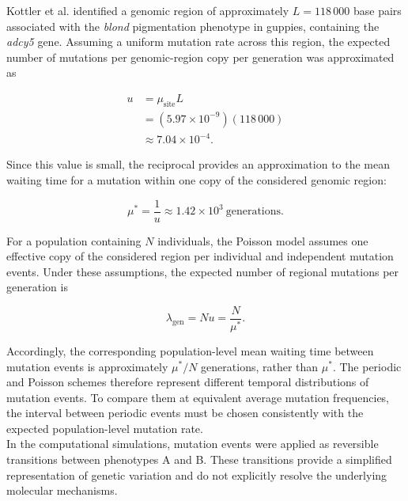 Kottler et al. \cite{kottlerAdenylateCyclase52015} identified a genomic region of approximately $L=118\,000$ base pairs associated with the \textit{blond} pigmentation phenotype in guppies, containing the \textit{adcy5} gene. Assuming a uniform mutation rate across this region, the expected number of mutations per genomic-region copy per generation was approximated as

\begin{equation}
\begin{aligned}
    u &= \mu_{\mathrm{site}}L\\
      &= (5.97\times10^{-9})(118\,000)\\
      &\approx 7.04\times10^{-4}.
\end{aligned}
\label{eq:regional_mutation_rate}
\end{equation}

Since this value is small, the reciprocal provides an approximation to the mean waiting time for a mutation within one copy of the considered genomic region:

\begin{equation}
    \mu^*=\frac{1}{u}
    \approx 1.42\times10^3
    \ \text{generations}.
    \label{eq:mutation}
\end{equation}

For a population containing $N$ individuals, the Poisson model assumes one effective copy of the considered region per individual and independent mutation events. Under these assumptions, the expected number of regional mutations per generation is

\begin{equation}
    \lambda_{\mathrm{gen}}
    =Nu
    =\frac{N}{\mu^*}.
    \label{eq:poisson_parameter}
\end{equation}

Accordingly, the corresponding population-level mean waiting time between mutation events is approximately $\mu^*/N$ generations, rather than $\mu^*$.  The periodic and Poisson schemes therefore represent different temporal distributions of mutation events. To compare them at equivalent average mutation frequencies, the interval between periodic events must be chosen consistently with the expected population-level mutation rate. \\ 

In the computational simulations, mutation events were applied as reversible transitions between phenotypes A and B. These transitions provide a simplified representation of genetic variation and do not explicitly resolve the underlying molecular mechanisms. \\ 

